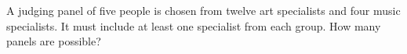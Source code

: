 A judging panel of five people is chosen from twelve art specialists and four music specialists. It must include at least one specialist from each group. How many panels are possible?
